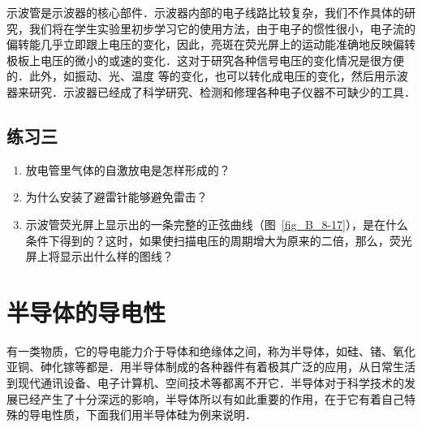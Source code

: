 示波管是示波器的核心部件．示波器内部的电子线路比较复杂，我们不作具体的研究，我们将在学生实验里初步学习它的使用方法，由于电子的惯性很小，电子流的偏转能几乎立即跟上电压的变化，因此，亮斑在荧光屏上的运动能准确地反映偏转极板上电压的微小的或速的变化．这对于研究各种信号电压的变化情况是很方便的．此外，如振动、光、温度
等的变化，也可以转化成电压的变化，然后用示波器来研究．示波器已经成了科学研究、检测和修理各种电子仪器不可缺少的工具．


\subsection*{练习三}
\begin{enumerate}
    \item 放电管里气体的自激放电是怎样形成的？
    \item 为什么安装了避雷针能够避免雷击？
    \item 示波管荧光屏上显示出的一条完整的正弦曲线（图~\ref{fig_B_8-17}），是在什么条件下得到的？这时，如果使扫描电压的周期增大为原来的二倍，那么，荧光屏上将显示出什么样的图线？
\end{enumerate}


\section{半导体的导电性}
有一类物质，它的导电能力介于导体和绝缘体之间，称为半导体，如硅、锗、氧化亚铜、砷化镓等都是．用半导体制成的各种器件有着极其广泛的应用，从日常生活到现代通讯设备、电子计算机、空间技术等都离不开它．半导体对于科学技术的发展已经产生了十分深远的影响，半导体所以有如此重要的作用，在于它有着自己特殊的导电性质，下面我们用半导体硅为例来说明．

